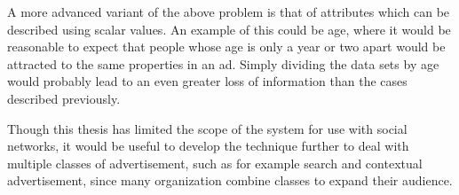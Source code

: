 \documentclass{sig-alternate}
\begin{document}
A more advanced variant of the above problem is that of attributes which can be described using scalar values. An example of this could be age, where it would be reasonable to expect that people whose age is only a year or two apart would be attracted to the same properties in an ad. Simply dividing the data sets by age would probably lead to an even greater loss of information than the cases described previously.

Though this thesis has limited the scope of the system for use with social networks, it would be useful to develop the technique further to deal with multiple classes of advertisement, such as for example search and contextual advertisement, since many organization combine classes to expand their audience.



\end{document}

